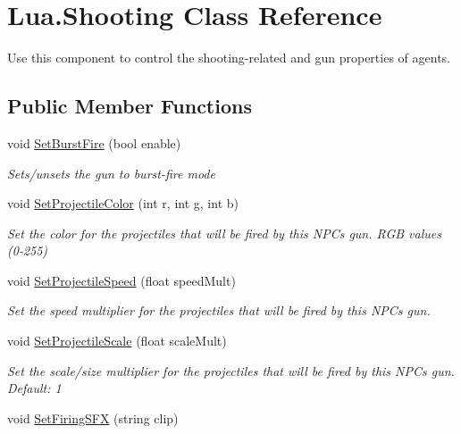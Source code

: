 \hypertarget{class_lua_1_1_shooting}{}\section{Lua.\+Shooting Class Reference}
\label{class_lua_1_1_shooting}


Use this component to control the shooting-\/related and gun properties of agents.  


\subsection*{Public Member Functions}
\begin{DoxyCompactItemize}
\item 
void \mbox{\hyperlink{class_lua_1_1_shooting_af0e7769dd39d32787d3197ebee1a3247}{Set\+Burst\+Fire}} (bool enable)
\begin{DoxyCompactList}\small\item\em Sets/unsets the gun to burst-\/fire mode \end{DoxyCompactList}\item 
void \mbox{\hyperlink{class_lua_1_1_shooting_adbbd67fdfd65fd5d754e66c44907c974}{Set\+Projectile\+Color}} (int r, int g, int b)
\begin{DoxyCompactList}\small\item\em Set the color for the projectiles that will be fired by this N\+PC\textquotesingle{}s gun. R\+GB values (0-\/255) \end{DoxyCompactList}\item 
void \mbox{\hyperlink{class_lua_1_1_shooting_a916d6868d5ab051898ea2f7d676587aa}{Set\+Projectile\+Speed}} (float speed\+Mult)
\begin{DoxyCompactList}\small\item\em Set the speed multiplier for the projectiles that will be fired by this N\+PC\textquotesingle{}s gun. \end{DoxyCompactList}\item 
void \mbox{\hyperlink{class_lua_1_1_shooting_a376edd82b6c42daab355831d5ecbc340}{Set\+Projectile\+Scale}} (float scale\+Mult)
\begin{DoxyCompactList}\small\item\em Set the scale/size multiplier for the projectiles that will be fired by this N\+PC\textquotesingle{}s gun. Default\+: 1 \end{DoxyCompactList}\item 
void \mbox{\hyperlink{class_lua_1_1_shooting_af28162d50b374775ee7618d1cc6c2063}{Set\+Firing\+S\+FX}} (string clip)

\end{DoxyCompactItemize}
